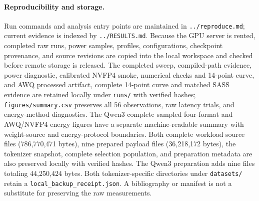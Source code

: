 \documentclass[10pt,twocolumn]{article}
\begin{document}
\paragraph{Reproducibility and storage.}
Run commands and analysis entry points are maintained in
\texttt{../reproduce.md}; current evidence is indexed by
\texttt{../RESULTS.md}. Because the GPU server is rented, completed raw runs,
power samples, profiles, configurations, checkpoint provenance, and source
revisions are copied into the local workspace and checked before remote
storage is released. The completed sweep, compiled-path evidence, power
diagnostic, calibrated NVFP4 smoke, numerical checks and 14-point curve,
and AWQ processed artifact, complete 14-point curve and matched SASS evidence are retained locally
under \texttt{runs/} with verified hashes;
\texttt{figures/summary.csv} preserves all 56 observations, raw latency
trials, and energy-method diagnostics. The Qwen3 complete sampled four-format and
AWQ/NVFP4 energy figures have a separate machine-readable summary with weight-source
and energy-protocol boundaries. Both complete workload source files
(786,770,471 bytes), nine prepared payload files (36,218,172 bytes), the
tokenizer snapshot, complete selection population, and preparation metadata
are also preserved locally with verified hashes. The Qwen3 preparation adds
nine files totaling 44,250,424 bytes. Both tokenizer-specific directories
under \texttt{datasets/} retain a \texttt{local\_backup\_receipt.json}.
A bibliography or manifest is not a
substitute for preserving the raw measurements.



\end{document}
